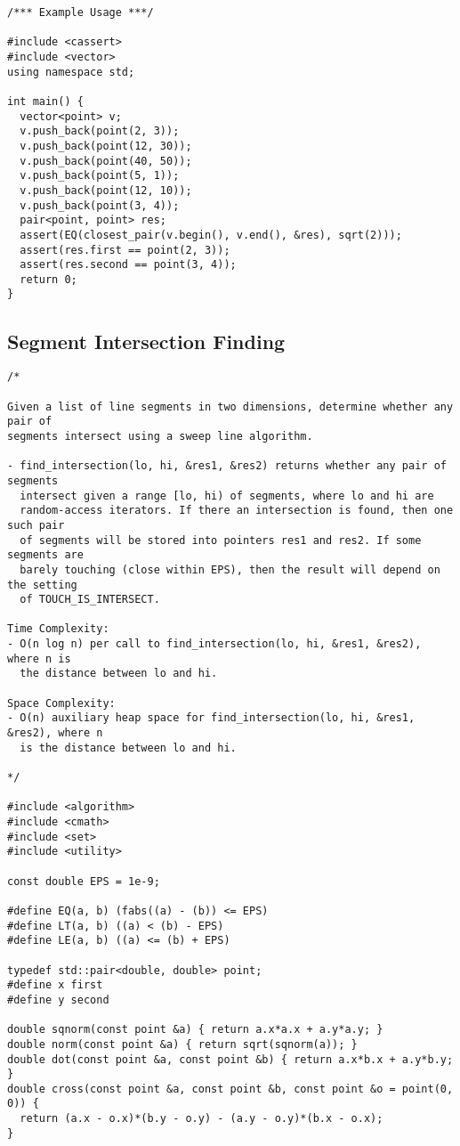 \begin{lstlisting}
/*** Example Usage ***/

#include <cassert>
#include <vector>
using namespace std;

int main() {
  vector<point> v;
  v.push_back(point(2, 3));
  v.push_back(point(12, 30));
  v.push_back(point(40, 50));
  v.push_back(point(5, 1));
  v.push_back(point(12, 10));
  v.push_back(point(3, 4));
  pair<point, point> res;
  assert(EQ(closest_pair(v.begin(), v.end(), &res), sqrt(2)));
  assert(res.first == point(2, 3));
  assert(res.second == point(3, 4));
  return 0;
}
\end{lstlisting}
\subsection{Segment Intersection Finding}
\begin{lstlisting}
/*

Given a list of line segments in two dimensions, determine whether any pair of
segments intersect using a sweep line algorithm.

- find_intersection(lo, hi, &res1, &res2) returns whether any pair of segments
  intersect given a range [lo, hi) of segments, where lo and hi are
  random-access iterators. If there an intersection is found, then one such pair
  of segments will be stored into pointers res1 and res2. If some segments are
  barely touching (close within EPS), then the result will depend on the setting
  of TOUCH_IS_INTERSECT.

Time Complexity:
- O(n log n) per call to find_intersection(lo, hi, &res1, &res2), where n is
  the distance between lo and hi.

Space Complexity:
- O(n) auxiliary heap space for find_intersection(lo, hi, &res1, &res2), where n
  is the distance between lo and hi.

*/

#include <algorithm>
#include <cmath>
#include <set>
#include <utility>

const double EPS = 1e-9;

#define EQ(a, b) (fabs((a) - (b)) <= EPS)
#define LT(a, b) ((a) < (b) - EPS)
#define LE(a, b) ((a) <= (b) + EPS)

typedef std::pair<double, double> point;
#define x first
#define y second

double sqnorm(const point &a) { return a.x*a.x + a.y*a.y; }
double norm(const point &a) { return sqrt(sqnorm(a)); }
double dot(const point &a, const point &b) { return a.x*b.x + a.y*b.y; }
double cross(const point &a, const point &b, const point &o = point(0, 0)) {
  return (a.x - o.x)*(b.y - o.y) - (a.y - o.y)*(b.x - o.x);
}


\end{lstlisting}
